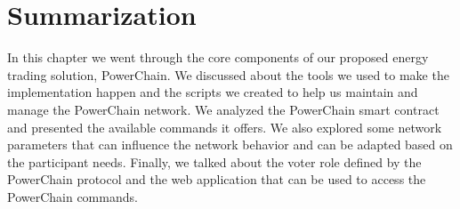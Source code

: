 \section{Summarization}
In this chapter we went through the core components of our proposed energy trading solution, PowerChain. We discussed about the tools we used to make the implementation happen and the scripts 
we created to help us maintain and manage the PowerChain network. We analyzed the PowerChain smart contract and presented the available commands it offers. We also explored some network parameters that
can influence the network behavior and can be adapted based on the participant needs. Finally, we talked about the voter role defined by the PowerChain protocol and the web application that can be used
to access the PowerChain commands.
